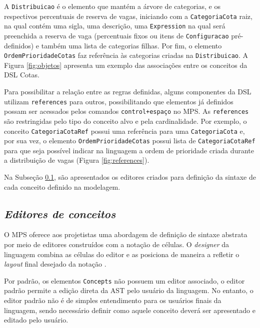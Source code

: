 A \texttt{Distribuicao} é o elemento que mantém a árvore de categorias, e os respectivos percentuais de reserva de vagas, iniciando com a \texttt{CategoriaCota} raiz, na qual contém uma sigla, uma descrição, uma \texttt{Expression} na qual será preenchida a reserva de vaga (percentuais fixos ou itens de \texttt{Configuracao} pré-definidos) e também uma lista de categorias filhas. Por fim, o elemento \texttt{OrdemPrioridadeCotas} faz referência às categorias criadas na \texttt{Distribuicao}. A Figura \ref{fig:objetos} apresenta um exemplo das associações entre os conceitos da DSL Cotas.



\newpage
Para possibilitar a relação entre as regras definidas, alguns componentes da \gls{DSL} utilizam \texttt{references} para outros, possibilitando que elementos já definidos possam ser acessados pelos comandos \texttt{control+espaço} no \gls{MPS}. As \texttt{references} são restringidas pelo tipo do conceito alvo e pela cardinalidade. Por exemplo, o conceito \texttt{CategoriaCotaRef} possui uma referência para uma \texttt{CategoriaCota} e, por sua vez, o elemento \texttt{OrdemPrioridadeCotas} possui lista de \texttt{CategoriaCotaRef} para que seja possível indicar na linguagem a ordem de prioridade criada durante a distribuição de vagas (Figura \ref{fig:references}).




Na Subseção \ref{sub:sec:editores}, são apresentados os editores criados para definição da sintaxe de cada conceito definido na modelagem.


\subsection{\textit{Editores de conceitos}}
\label{sub:sec:editores}
O \gls{MPS} oferece aos projetistas uma abordagem de definição de sintaxe abstrata por meio de editores construídos com a notação de células. O \textit{designer} da linguagem combina as células do editor e as posiciona de maneira a refletir o \textit{layout} final desejado da notação \cite{jetbrains}. 

Por padrão, os elementos \texttt{Concepts} não possuem um editor associado, o editor padrão permite a edição direta da \gls{AST} pelo usuário da linguagem. No entanto, o editor padrão não é de simples entendimento para os usuários finais da linguagem, sendo necessário definir como aquele conceito deverá ser apresentado e editado pelo usuário.

